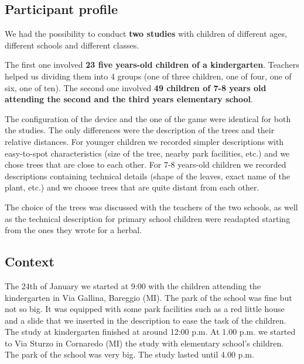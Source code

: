 \documentclass[a4paper,11pt]{report}
\begin{document}
\subsection{Participant profile}
We had the possibility to conduct \textbf{two studies} with children of different ages, different schools and different classes.\par
The first one involved \textbf{23 five years-old children of a kindergarten}. Teachers helped us dividing them into 4 groups (one of three children, one of four, one of six, one of ten).  The second one involved \textbf{49 children of 7-8 years old attending the second and the third years elementary school}.\par
The configuration of the device and the one of the game were identical for both the studies. The only differences were the description of the trees and their relative distances. For younger children we recorded simpler descriptions with easy-to-spot characteristics (size of the tree, nearby park facilities, etc.) and we chose trees that are close to each other. For 7-8 years-old children we recorded descriptions containing technical details (shape of the leaves, exact name of the plant, etc.) and we choose trees that are quite distant from each other.\par
The choice of the trees was discussed with the teachers of the two schools, as well as the technical description for primary school children were readapted starting from the ones they wrote for a herbal.
\subsection{Context}
The 24th of January we started at 9:00 with the children attending the kindergarten in Via Gallina, Bareggio (MI). The park of the school was fine but not so big. It was equipped with some park facilities such as a red little house and a slide that we inserted in the description to ease the task of the children. The study at kindergarten finished at around 12:00 p.m. At 1.00 p.m. we started to Via Sturzo in Cornaredo (MI) the study with elementary school's children. The park of the school was very big. The study lasted until 4.00 p.m. 
\end{document}
